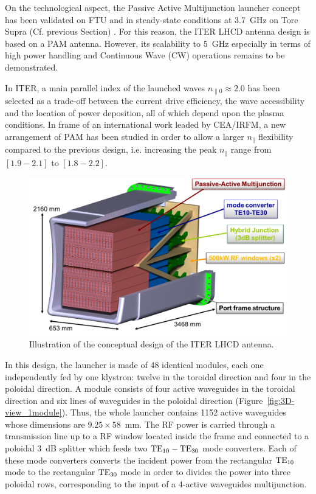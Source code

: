 On the technological aspect, the Passive Active Multijunction launcher concept has been validated on FTU and in steady-state conditions at 3.7~\si{GHz} on Tore Supra (Cf. previous Section) . For this reason, the ITER LHCD antenna design is based on a PAM antenna. However, its scalability to 5~\si{GHz} especially in terms of high power handling and Continuous Wave (CW) operations remains to be demonstrated. 

In ITER, a main parallel index of the launched waves $n_{\parallel 0} \approx 2.0$ has been selected as a trade-off between the current drive efficiency, the wave accessibility and the location of power deposition, all of which depend upon the plasma conditions. In frame of an international work leaded by CEA/IRFM, a new arrangement of PAM has been studied in order to allow a larger $n_{\parallel}$ flexibility compared to the previous design\cite{bibet2005-1}, i.e. increasing the peak $n_{\parallel}$ range from $\left[1.9-2.1\right]$ to $\left[1.8-2.2\right]$. 

\begin{figure}
	\centering
	\includegraphics[width=1.0\linewidth]{figures/chap3/ITER_antenna/ITER_LH_antenna}
	\caption{Illustration of the conceptual design of the ITER LHCD antenna. }
	\label{fig:iterlhantenna}
\end{figure}

In this design, the launcher is made of 48 identical modules, each one independently fed by one klystron: twelve in the toroidal direction and four in the poloidal direction. A module consists of four active waveguides in the toroidal direction and six lines of waveguides in the poloidal direction (Figure~\ref{fig:3D-view_1module}). Thus, the whole launcher contains 1152 active waveguides whose dimensions are $9.25\times58$~mm. The RF power is carried through a transmission line up to a RF window
located inside the frame and connected to a poloidal 3~dB splitter which feeds two ${\mathrm{TE}}_{10}-{\mathrm{TE}}_{30}$ mode converters. Each of these mode converters converts the incident power from the rectangular ${\mathrm{TE}}_{10}$ mode to the rectangular ${\mathrm{TE}}_{30}$ mode in order to divides the power into three poloidal rows, corresponding to the input of a 4-active waveguides multijunction. 

